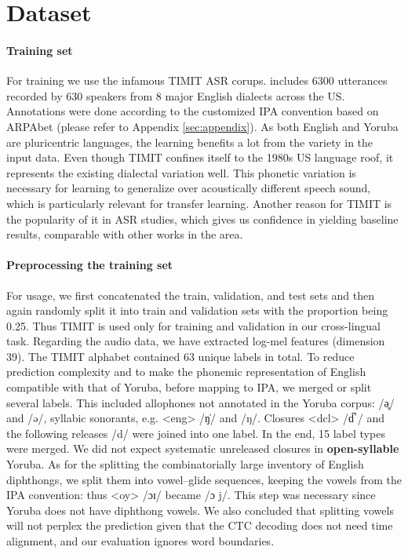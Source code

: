\documentclass[11pt]{article}
\newcommand{\ipa}[1]{{\ipafont #1}}
\begin{document}
\section{Dataset}
\paragraph{Training set} For training we use the infamous TIMIT ASR corups. \cite{garofolo1993timit} includes 6300 utterances recorded by 630 speakers from 8 major English dialects across the US. Annotations were done according to the customized IPA convention based on ARPAbet \cite{cmudict} (please refer to Appendix \ref{sec:appendix}). As both English and Yoruba are pluricentric languages, the learning benefits a lot from the variety in the input data. Even though TIMIT confines itself to the 1980s US language roof, it represents the existing dialectal variation well. This phonetic variation is necessary for learning to generalize over acoustically different speech sound, which is particularly relevant for transfer learning. Another reason for TIMIT is the popularity of it in ASR studies, which gives us confidence in yielding baseline results, comparable with other works in the area.

\paragraph{Preprocessing the training set} For usage, we first concatenated the train, validation, and test sets and then again randomly split it into train and validation sets with the proportion being 0.25. Thus TIMIT is used only for training and validation in our cross-lingual task. Regarding the audio data, we have extracted log-mel features (dimension 39). The TIMIT alphabet contained 63 unique labels in total. To reduce prediction complexity and to make the phonemic representation of English compatible with that of Yoruba, before mapping to IPA, we merged or split several labels. This included allophones not annotated in the Yoruba corpus: \ipa{<ax-h> /ə̥/} and \ipa{/ə/}, syllabic sonorants, e.g. \ipa{<eng> /ŋ̍/} and \ipa{/ŋ/}. Closures \ipa{<dcl> /d̚ /} and the following releases \ipa{/d/} were joined into one label. In the end, 15 label types were merged. We did not expect systematic unreleased closures in \textbf{open-syllable} Yoruba. \cite{Adesola2024} As for the splitting the combinatorially large inventory of English diphthongs, we split them into vowel--glide sequences, keeping the vowels from the IPA convention: thus \ipa{<oy> /ɔɪ/} became \ipa{<ao y> /ɔ j/}. This step was necessary since Yoruba does not have diphthong vowels. \citet{Przezdziecki2005} We also concluded that splitting vowels will not perplex the prediction given that the CTC decoding does not need time alignment, and our evaluation ignores word boundaries.
\end{document}
